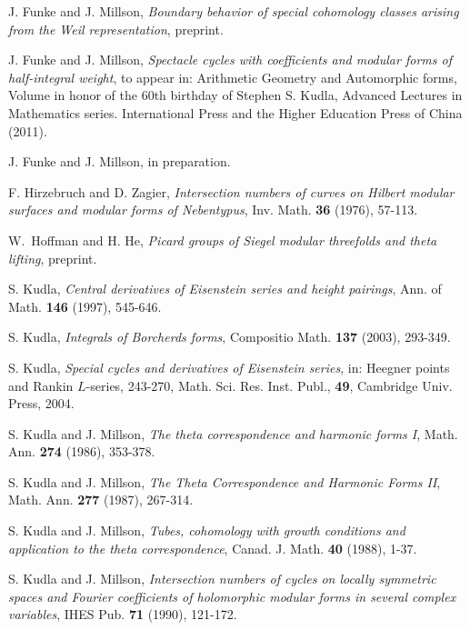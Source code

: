 \documentclass[12pt,leqno]{amsart}
\numberwithin{equation}{section}
\theoremstyle{plain}
\theoremstyle{definition}
\theoremstyle{remark}
\begin{document}
\begin{thebibliography}{99}
J. Funke and J. Millson, \emph{Boundary behavior of special cohomology classes arising from the Weil representation}, preprint. 

J. Funke and J. Millson, \emph {Spectacle cycles with coefficients and modular forms of half-integral weight}, to appear in: Arithmetic Geometry and Automorphic forms, Volume in honor of the 60th birthday of Stephen S. Kudla, Advanced Lectures in Mathematics series. International Press and the Higher Education Press of China (2011).

J. Funke and J. Millson, in preparation.


F. Hirzebruch and D. Zagier, \emph{Intersection numbers of curves on
Hilbert modular surfaces and modular forms of Nebentypus}, Inv.
Math. \textbf{36} (1976), 57-113.






W.\ Hoffman and H. He, \emph{Picard groups of Siegel modular threefolds and theta lifting}, preprint.
 

S. Kudla, \emph{Central derivatives of Eisenstein series and height
pairings}, Ann. of Math. \textbf{146} (1997), 545-646.


S. Kudla, \emph{Integrals of Borcherds forms}, Compositio Math.
\textbf{137} (2003), 293-349.

S. Kudla, \emph{Special cycles and derivatives of Eisenstein
series}, in: Heegner points and Rankin $L$-series, 243-270, Math.
Sci. Res. Inst. Publ., \textbf{49}, Cambridge Univ. Press, 2004.



S. Kudla and J. Millson, \emph{The theta correspondence and harmonic
forms I}, Math. Ann. \textbf{274} (1986), 353-378.


S. Kudla and J. Millson,
\emph{The Theta Correspondence and Harmonic Forms II},
Math. Ann. \textbf{277} (1987), 267-314.

S. Kudla and J. Millson,
\emph{Tubes, cohomology with growth
conditions and application to the theta correspondence}, Canad. J.
Math. \textbf{40} (1988), 1-37.

S. Kudla and J. Millson, \emph{Intersection numbers of cycles on
locally symmetric spaces and Fourier coefficients of holomorphic
modular forms in several complex variables}, IHES Pub. \textbf{71}
(1990), 121-172.





\end{thebibliography}
\end{document}

